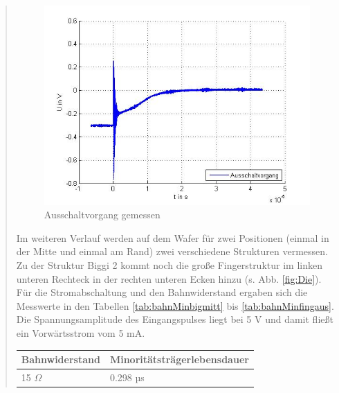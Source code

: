 \begin{quote}
    \begin{figure}[H]
        \centering
        \includegraphics[scale=0.7]{./SchaltverhaltenBilder/Ausschaltvorgang_bild.jpg}
        \caption{Ausschaltvorgang gemessen}
        \label{fig:aussgemessen}
    \end{figure}

    \vspace{2em}

    Im weiteren Verlauf werden auf dem Wafer für zwei Positionen (einmal in der
    Mitte und einmal am Rand) zwei verschiedene Strukturen vermessen. Zu der
    Struktur Biggi 2 kommt noch die große Fingerstruktur im linken unteren
    Rechteck in der rechten unteren Ecken hinzu (s. Abb. \ref{fig:Die}). Für die
    Stromabschaltung und den Bahnwiderstand ergaben sich die Messwerte in den
    Tabellen \ref{tab:bahnMinbigmitt} bis \ref{tab:bahnMinfingaus}. Die
    Spannungsamplitude des Eingangspulses liegt bei 5 V und damit fließt ein
    Vorwärtsstrom vom 5 mA.

    \vspace{2em}

            \begin{table}[H]
              \begin{addmargin}[3cm]{3cm}
                \centering
                   \begin{tabular}{|p{5cm}|p{5cm}|}
                    \hline
                    Bahnwiderstand &  Minoritätsträgerlebensdauer\\
                    \hline
                    15 $\Omega$ & 0.298 µs \\
                    \hline


\end{tabular}
\end{addmargin}
\end{table}
\end{quote}

